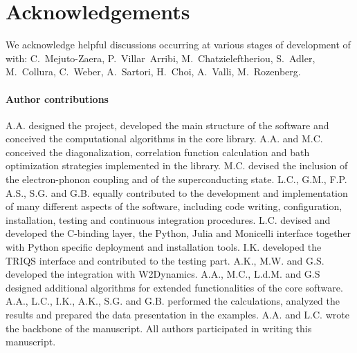 \documentclass[edipack_sp.tex]{subfiles}
\begin{document}


\section*{Acknowledgements}
We acknowledge helpful discussions occurring at various stages of development of \NAME with: C.~Mejuto-Zaera, P.~Villar~Arribi, M.~Chatzieleftheriou, S.~Adler, M.~Collura, C.~Weber, A.~Sartori, H.~Choi, A.~Valli, M.~Rozenberg.    

\paragraph{Author contributions}
A.A. designed the project, developed the main structure of the software and conceived the computational algorithms in the core library. A.A. and M.C. conceived the diagonalization, correlation function  calculation and bath optimization strategies implemented in the library. M.C. devised the inclusion of the electron-phonon coupling and of the superconducting state. 
L.C., G.M., F.P. A.S., S.G. and G.B.  equally contributed to the development and implementation of many different aspects of the  software, including code writing, configuration, installation, testing and continuous integration procedures. 
L.C. devised and developed the C-binding layer, the Python, Julia and Monicelli interface together with Python specific deployment and installation tools. 
I.K. developed the TRIQS interface and contributed to the testing part. 
A.K., M.W. and G.S. developed the integration with W2Dynamics.  
A.A., M.C., L.d.M. and G.S designed additional algorithms for extended functionalities of the core software.   
A.A., L.C., I.K., A.K., S.G. and G.B. performed the calculations, analyzed the results and prepared the data presentation in the examples.
A.A. and L.C. wrote the backbone of the manuscript.
All authors participated in writing this manuscript. 

\end{document}
